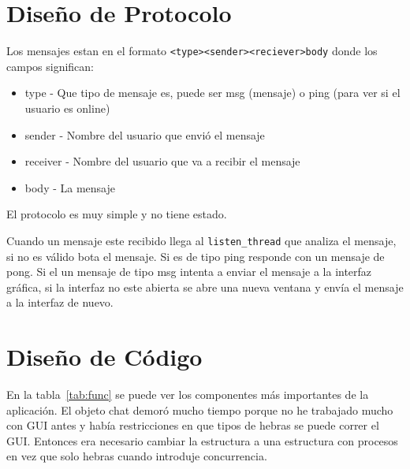 \documentclass[a4paper, 12pt]{article}
\begin{document}
\section{Diseño de Protocolo}
Los mensajes estan en el formato \texttt{<type><sender><reciever>body} donde los
campos significan:
\begin{itemize}
        \item type - Que tipo de mensaje es, puede ser msg (mensaje) o ping
                (para ver si el usuario es online)
        \item sender - Nombre del usuario que envió el mensaje
        \item receiver - Nombre del usuario que va a recibir el mensaje
        \item body - La mensaje
\end{itemize}

El protocolo es muy simple y no tiene estado.

Cuando un mensaje este recibido llega al \texttt{listen\_thread} que analiza el
mensaje, si no es válido bota el mensaje. Si es de tipo ping responde con un
mensaje de pong. Si el un mensaje de tipo msg intenta a enviar el mensaje a la
interfaz gráfica, si la interfaz no este abierta se abre una nueva ventana y
envía el mensaje a la interfaz de nuevo.

\section{Diseño de Código}
En la tabla~\ref{tab:func} se puede ver los componentes más importantes de la aplicación.
El objeto chat demoró mucho tiempo porque no he trabajado mucho con GUI antes y
había restricciones en que tipos de hebras se puede correr el GUI. Entonces era
necesario cambiar la estructura a una estructura con procesos en vez que solo
hebras cuando introduje concurrencia.
\end{document}
